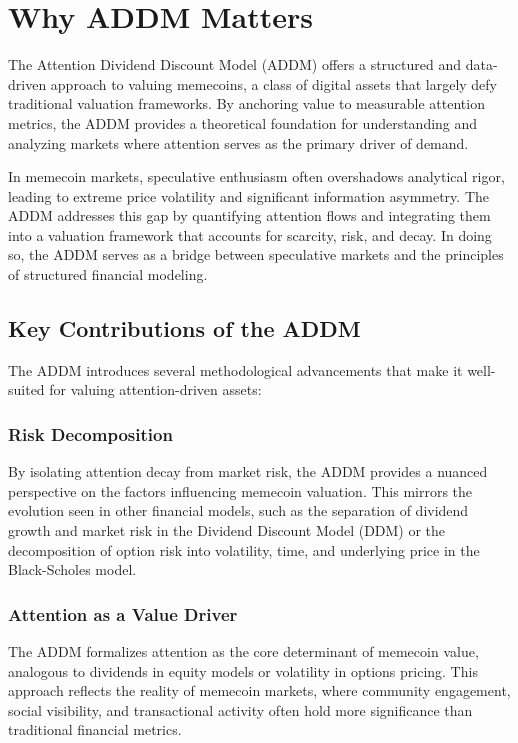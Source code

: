 \documentclass[a4paper,12pt]{article}
\begin{document}
\section*{Why ADDM Matters}

The Attention Dividend Discount Model (ADDM) offers a structured and data-driven approach to valuing memecoins, a class of digital assets that largely defy traditional valuation frameworks. By anchoring value to measurable attention metrics, the ADDM provides a theoretical foundation for understanding and analyzing markets where attention serves as the primary driver of demand. 

In memecoin markets, speculative enthusiasm often overshadows analytical rigor, leading to extreme price volatility and significant information asymmetry. The ADDM addresses this gap by quantifying attention flows and integrating them into a valuation framework that accounts for scarcity, risk, and decay. In doing so, the ADDM serves as a bridge between speculative markets and the principles of structured financial modeling.

\subsection*{Key Contributions of the ADDM}

The ADDM introduces several methodological advancements that make it well-suited for valuing attention-driven assets:

\subsubsection*{Risk Decomposition}
By isolating attention decay from market risk, the ADDM provides a nuanced perspective on the factors influencing memecoin valuation. This mirrors the evolution seen in other financial models, such as the separation of dividend growth and market risk in the Dividend Discount Model (DDM) or the decomposition of option risk into volatility, time, and underlying price in the Black-Scholes model.

\subsubsection*{Attention as a Value Driver}
The ADDM formalizes attention as the core determinant of memecoin value, analogous to dividends in equity models or volatility in options pricing. This approach reflects the reality of memecoin markets, where community engagement, social visibility, and transactional activity often hold more significance than traditional financial metrics.
\end{document}

